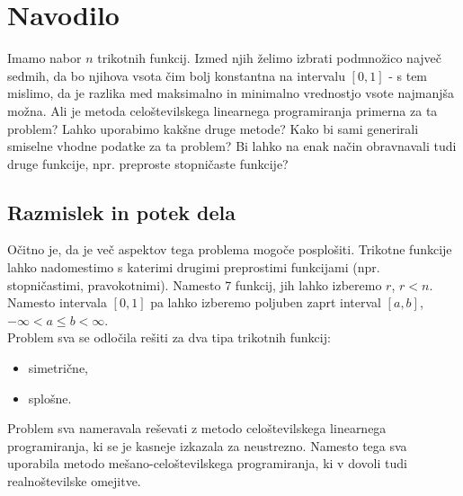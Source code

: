 \documentclass[11pt]{article}
\theoremstyle{definition}
\newcommand{\1}{\mathbbm{1}}
\begin{document}

\section{Navodilo}
\vspace{0.5cm}

Imamo nabor $n$ trikotnih funkcij. Izmed njih želimo izbrati podmnožico največ sedmih, da bo njihova vsota čim bolj konstantna na intervalu $[0,1]$ - s tem mislimo, da je razlika med maksimalno in minimalno vrednostjo vsote najmanjša možna. Ali je metoda celoštevilskega linearnega programiranja primerna za ta problem? Lahko uporabimo kakšne druge metode? Kako bi sami generirali smiselne vhodne podatke za ta problem? Bi lahko na enak način obravnavali tudi druge funkcije, npr. preproste stopničaste funkcije?


\subsection{Razmislek in potek dela}
\vspace{0.5cm}

Očitno je, da je več aspektov tega problema mogoče posplošiti. Trikotne funkcije lahko nadomestimo s katerimi drugimi preprostimi funkcijami (npr. stopničastimi, pravokotnimi). Namesto 7 funkcij, jih lahko izberemo $r$, $r < n$. Namesto intervala $[0,1]$ pa lahko izberemo poljuben zaprt interval $[a,b]$, $-\infty < a \leq b < \infty$. \\

Problem sva se odločila rešiti za dva tipa trikotnih funkcij:
\begin{itemize}
	\item simetrične,
	\item splošne.
\end{itemize}

Problem sva nameravala reševati z metodo celoštevilskega linearnega programiranja, ki se je kasneje izkazala za neustrezno. Namesto tega sva uporabila metodo mešano-celoštevilskega programiranja, ki v dovoli tudi realnoštevilske omejitve. \\
\end{document}
